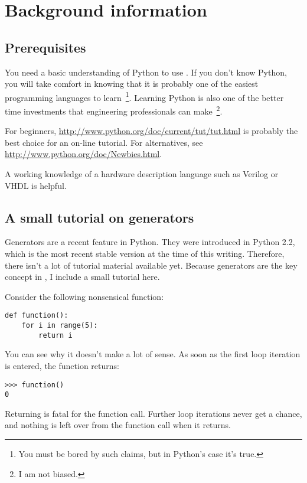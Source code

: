 \chapter{Background information \label{background}}

\section{Prerequisites \label{prerequisites}}

You need a basic understanding of Python to use \myhdl{}.
If you don't know Python, you will take comfort in knowing
that it is probably one of the easiest programming languages to
learn~\footnote{You must be bored by such claims, but in Python's
case it's true.}. Learning Python is also one of the better time
investments that engineering professionals can make~\footnote{I am not
biased.}.

For beginners, \url{http://www.python.org/doc/current/tut/tut.html} is
probably the best choice for an on-line tutorial. For alternatives,
see \url{http://www.python.org/doc/Newbies.html}.

A working knowledge of a hardware description language such as Verilog
or VHDL is helpful. 

\section{A small tutorial on generators \label{tutorial}}

Generators are a recent feature in Python. They were introduced in
Python 2.2, which is the most recent stable version at the time of
this writing. Therefore, there isn't a lot of tutorial material
available yet. Because generators are the key concept in
\myhdl{}, I include a small tutorial here.

Consider the following nonsensical function:

\begin{verbatim}
def function():
    for i in range(5):
        return i
\end{verbatim}

You can see why it doesn't make a lot of sense. As soon as the first
loop iteration is entered, the function returns:

\begin{verbatim}
>>> function()
0
\end{verbatim}

Returning is fatal for the function call. Further loop iterations
never get a chance, and nothing is left over from the function call
when it returns.

